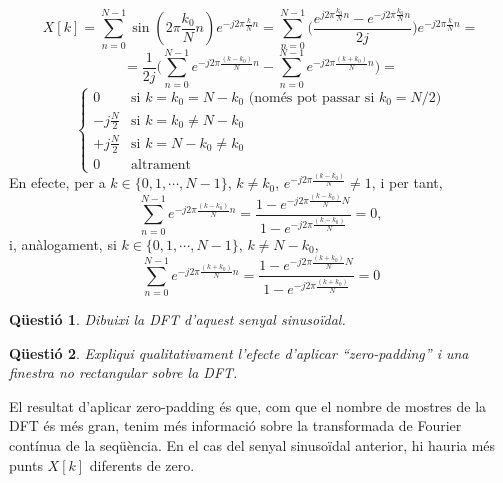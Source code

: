 \documentclass[11pt,a4]{article}
\numberwithin{equation}{section}
\theoremstyle{thmstyle}
\theoremstyle{thmstyle}
\theoremstyle{thmstyle}
\theoremstyle{thmstyle}
\theoremstyle{thmstyle}
\theoremstyle{thmstyle}
\newtheorem{question}{Qüestió}
\theoremstyle{thmstyle}
\renewcommand{\ss}{\scriptstyle}
\begin{document}
$$X[k] = \sum_{n=0}^{N-1}\sin(2\pi\frac{k_0}{N}n)e^{-j2\pi\frac{k}{N}n} = \sum_{n=0}^{N-1}\Big(\frac{e^{j2\pi\frac{k_0}{N}n}-e^{-j2\pi\frac{k_0}{N}n}}{2j}\Big)e^{-j2\pi\frac{k}{N}n}=
$$
$$
=\frac{1}{2j}\Big(\sum_{n=0}^{N-1}e^{-j2\pi\frac{(k-k_0)}{N}n}-\sum_{n=0}^{N-1}e^{-j2\pi\frac{(k+k_0)}{N}n}\Big)=
$$
$$
\begin{cases}
0                 & \text{si $k=k_0=N-k_0$ (només pot passar si $k_0 = N/2$)} \\
-j\frac{N}{2}     & \text{si $k=k_0\neq N-k_0$} \\
+j\frac{N}{2}     & \text{si $k=N-k_0\neq k_0$} \\
0                 & \text{altrament}
\end{cases}
$$
En efecte, per a $k\in\lbrace 0,1,\cdots,N-1\rbrace$, $k\neq k_0$, $e^{-j2\pi\frac{(k-k_0)}{N}}\neq 1$, i per tant,
$$
\sum_{n=0}^{N-1}e^{-j2\pi\frac{(k-k_0)}{N}n}=\frac{1-e^{-j2\pi\frac{(k-k_0)}{N}N}}{1-e^{-j2\pi\frac{(k-k_0)}{N}}} = 0,
$$
i, anàlogament, si $k\in\lbrace 0,1,\cdots,N-1\rbrace$, $k\neq N-k_0$,
$$
\sum_{n=0}^{N-1}e^{-j2\pi\frac{(k+k_0)}{N}n}=\frac{1-e^{-j2\pi\frac{(k+k_0)}{N}N}}{1-e^{-j2\pi\frac{(k+k_0)}{N}}} = 0
$$

\begin{question}
Dibuixi la DFT d'aquest senyal sinusoïdal.
\end{question}

\begin{figure}[ht]
\centering
\end{figure}

\begin{question}
Expliqui qualitativament l’efecte d’aplicar “zero-padding” i una finestra no rectangular sobre la DFT.
\end{question}
El resultat d'aplicar zero-padding és que, com que el nombre de mostres de la DFT és més gran, tenim més informació sobre la transformada de Fourier contínua de la seqüència. En el cas del senyal sinusoïdal anterior, hi hauria més punts $X[k]$ diferents de zero.
\end{document}

